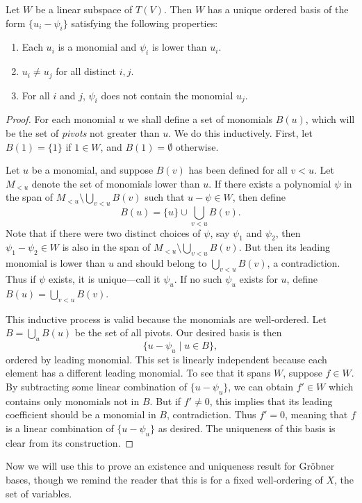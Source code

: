 \begin{prop}\label{prop:rref}
	Let $W$ be a linear subspace of $T(V)$. Then $W$ has a unique ordered basis of the form $\{u_i - \psi_i\}$ satisfying the following properties:
	\begin{enumerate}
		\item Each $u_i$ is a monomial and $\psi_i$ is lower than $u_i$.
		\item $u_i \neq u_j$ for all distinct $i,j$.
		\item For all $i$ and $j$, $\psi_i$ does not contain the monomial $u_j$.
	\end{enumerate}
\end{prop}
\begin{proof}
	For each monomial $u$ we shall define a set of monomials $B(u)$, which will be the set of \emph{pivots} not greater than $u$. We do this inductively. First, let $B(1) = \{1\}$ if $1 \in W$, and $B(1) = \emptyset$ otherwise.
	
	Let $u$ be a monomial, and suppose $B(v)$ has been defined for all $v < u$. Let $M_{<u}$ denote the set of monomials lower than $u$. If there exists a polynomial $\psi$ in the span of $M_{<u} \setminus \bigcup_{v<u} B(v)$ such that $u - \psi \in W$, then define
	\[
		B(u) = \{u\} \cup \bigcup_{v<u} B(v).
	\]
	Note that if there were two distinct choices of $\psi$, say $\psi_1$ and $\psi_2$, then $\psi_1 - \psi_2 \in W$ is also in the span of $M_{<u} \setminus \bigcup_{v<u} B(v)$. But then its leading monomial is lower than $u$ and should belong to $\bigcup_{v<u} B(v)$, a contradiction. Thus if $\psi$ exists, it is unique---call it $\psi_u$. If no such $\psi_u$ exists for $u$, define $B(u) = \bigcup_{v<u} B(v)$.
	
	This inductive process is valid because the monomials are well-ordered. Let $B = \bigcup_u B(u)$ be the set of all pivots. Our desired basis is then
	\[
		\{u - \psi_u \mid u \in B\},
	\]
	ordered by leading monomial. This set is linearly independent because each element has a different leading monomial. To see that it spans $W$, suppose $f\in W$. By subtracting some linear combination of $\{u - \psi_u\}$, we can obtain $f' \in W$ which contains only monomials not in $B$. But if $f' \neq 0$, this implies that its leading coefficient should be a monomial in $B$, contradiction. Thus $f' = 0$, meaning that $f$ is a linear combination of $\{u - \psi_u\}$ as desired. The uniqueness of this basis is clear from its construction.
\end{proof}
Now we will use this to prove an existence and uniqueness result for Gr\"obner bases, though we remind the reader that this is for a fixed well-ordering of $X$, the set of variables.
